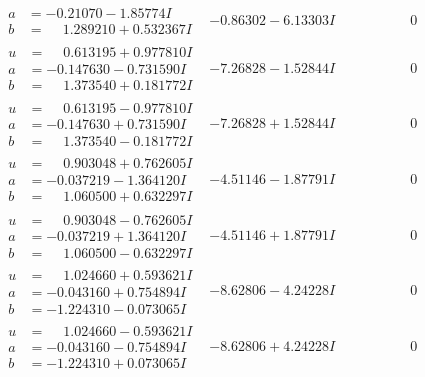 \documentclass[1p]{elsarticle_modified}
\theoremstyle{definition}
\begin{document}
$$\begin{array}{c|c|c}
\begin{aligned}
a &= -0.21070 - 1.85774 I \\
b &= \phantom{-}1.289210 + 0.532367 I\end{aligned}
 & -0.86302 - 6.13303 I & \phantom{-0.000000 } 0 \\ \hline\begin{aligned}
u &= \phantom{-}0.613195 + 0.977810 I \\
a &= -0.147630 - 0.731590 I \\
b &= \phantom{-}1.373540 + 0.181772 I\end{aligned}
 & -7.26828 - 1.52844 I & \phantom{-0.000000 } 0 \\ \hline\begin{aligned}
u &= \phantom{-}0.613195 - 0.977810 I \\
a &= -0.147630 + 0.731590 I \\
b &= \phantom{-}1.373540 - 0.181772 I\end{aligned}
 & -7.26828 + 1.52844 I & \phantom{-0.000000 } 0 \\ \hline\begin{aligned}
u &= \phantom{-}0.903048 + 0.762605 I \\
a &= -0.037219 - 1.364120 I \\
b &= \phantom{-}1.060500 + 0.632297 I\end{aligned}
 & -4.51146 - 1.87791 I & \phantom{-0.000000 } 0 \\ \hline\begin{aligned}
u &= \phantom{-}0.903048 - 0.762605 I \\
a &= -0.037219 + 1.364120 I \\
b &= \phantom{-}1.060500 - 0.632297 I\end{aligned}
 & -4.51146 + 1.87791 I & \phantom{-0.000000 } 0 \\ \hline\begin{aligned}
u &= \phantom{-}1.024660 + 0.593621 I \\
a &= -0.043160 + 0.754894 I \\
b &= -1.224310 - 0.073065 I\end{aligned}
 & -8.62806 - 4.24228 I & \phantom{-0.000000 } 0 \\ \hline\begin{aligned}
u &= \phantom{-}1.024660 - 0.593621 I \\
a &= -0.043160 - 0.754894 I \\
b &= -1.224310 + 0.073065 I\end{aligned}
 & -8.62806 + 4.24228 I & \phantom{-0.000000 } 0\\

\end{array}$$
\end{document}

